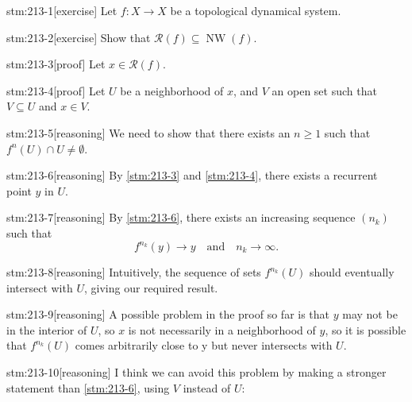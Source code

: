 \documentclass{article}
\begin{document}

\begin{stm}{stm:213-1}[exercise]
Let $f : X \to X$ be a topological dynamical system.
\end{stm}

\begin{stm}{stm:213-2}[exercise]
Show that $\mathcal{R}(f) \subseteq \operatorname{NW}(f)$.
\end{stm}


\begin{stm}{stm:213-3}[proof]
Let $x \in \mathcal{R}(f)$. 
\end{stm}

\begin{stm}{stm:213-4}[proof]
Let $U$ be a neighborhood of $x$, and $V$ an open set such that $V \subseteq U$ and $x \in V$.
\end{stm}

\begin{stm}{stm:213-5}[reasoning]
We need to show that there exists an $n \geq 1$ such that $f^n(U) \cap U \neq \emptyset$.
\end{stm}

\begin{stm}{stm:213-6}[reasoning]
By \ref{stm:213-3} and \ref{stm:213-4}, there exists a recurrent point $y$ in $U$.
\end{stm}

\begin{stm}{stm:213-7}[reasoning]
By \ref{stm:213-6}, there exists an increasing sequence $(n_k)$ such that 
\[
f^{n_k}(y) \to y \quad \text{and} \quad n_k \to \infty.
\]
\end{stm}

\begin{stm}{stm:213-8}[reasoning]
Intuitively, the sequence of sets $f^{n_k}(U)$ should eventually intersect with $U$, giving our required result.
\end{stm}

\begin{stm}{stm:213-9}[reasoning]
A possible problem in the proof so far is that $y$ may not be in the interior of $U$, so $x$ is not necessarily in a neighborhood of $y$, so it is possible that $f^{n_k}(U)$ comes arbitrarily close to y but never intersects with $U$.
\end{stm}

\begin{stm}{stm:213-10}[reasoning]
I think we can avoid this problem by making a stronger statement than \ref{stm:213-6}, using $V$ instead of $U$:
\end{stm}
\end{document}
